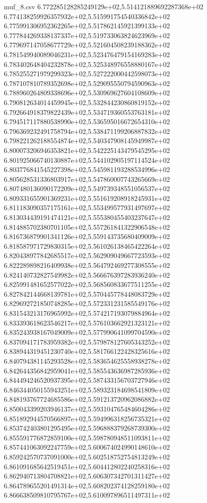 \begin{filecontents*}{muf_8.csv}
6.772285128285249129e+02,5.514121889692287368e+02
6.774138259926357932e+02,5.515991754540336842e+02
6.775991306952362265e+02,5.517862145921399133e+02
6.777844269338137337e+02,5.519733063824623969e+02
6.779697147058677729e+02,5.521604508239188362e+02
6.781549940089046231e+02,5.523476479154169283e+02
6.783402648404232878e+02,5.525348976558880167e+02
6.785255271979299323e+02,5.527222000442598073e+02
6.787107810789352698e+02,5.529095550794590963e+02
6.788960264809338696e+02,5.530969627604108609e+02
6.790812634014459945e+02,5.532844230860819152e+02
6.792664918379822439e+02,5.534719360553763181e+02
6.794517117880538990e+02,5.536595016672654310e+02
6.796369232491758794e+02,5.538471199206887832e+02
6.798221262188554874e+02,5.540347908145949987e+02
6.800073206946353821e+02,5.542225143479545295e+02
6.801925066740130887e+02,5.544102905197114524e+02
6.803776841545227398e+02,5.545981193288534996e+02
6.805628531336803917e+02,5.547860007743265669e+02
6.807480136090172209e+02,5.549739348551056537e+02
6.809331655901369231e+02,5.551619208918245931e+02
6.811183090357175161e+02,5.553499577931497697e+02
6.813034439191474121e+02,5.555380455403237647e+02
6.814885702380701105e+02,5.557261841322906548e+02
6.816736879901341126e+02,5.559143735680409009e+02
6.818587971729830315e+02,5.561026138465422264e+02
6.820438977842685517e+02,5.562909049667723593e+02
6.822289898216409938e+02,5.564792469277308555e+02
6.824140732827549982e+02,5.566676397283936240e+02
6.825991481652577022e+02,5.568560833677511255e+02
6.827842144668139781e+02,5.570445778448083729e+02
6.829692721850748285e+02,5.572331231585549176e+02
6.831543213176965992e+02,5.574217193079884964e+02
6.833393618623546217e+02,5.576103662921323121e+02
6.835243938167049009e+02,5.577990641099704590e+02
6.837094171783959382e+02,5.579878127605343252e+02
6.838944319451230740e+02,5.581766122428325616e+02
6.840794381145293528e+02,5.583654625558938278e+02
6.842644356842959041e+02,5.585543636987285936e+02
6.844494246520937395e+02,5.587433156703727946e+02
6.846344050155943251e+02,5.589323184698541809e+02
6.848193767724685586e+02,5.591213720962086882e+02
6.850043399203946137e+02,5.593104765484604286e+02
6.851892944570566897e+02,5.594996318256735321e+02
6.853742403801295495e+02,5.596888379268739300e+02
6.855591776872859100e+02,5.598780948511093811e+02
6.857441063092247759e+02,5.600674024990148610e+02
6.859242570737091000e+02,5.602518752754813249e+02
6.861091685642519451e+02,5.604412802240258316e+02
6.862940713804708821e+02,5.606307342701311427e+02
6.864789655201491314e+02,5.608202374128259180e+02
6.866638509810795767e+02,5.610097896511497311e+02

\end{filecontents*}
